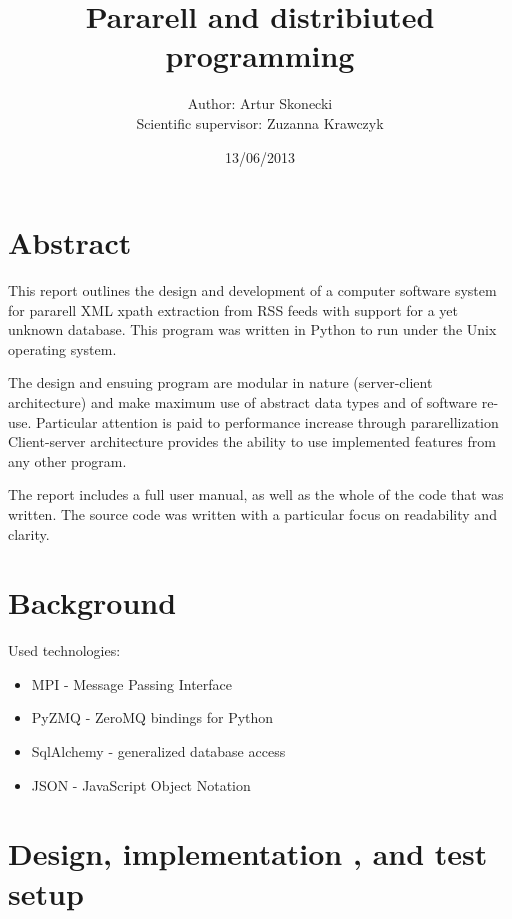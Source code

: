 \documentclass[a4paper,12pt]{article}
\title{Pararell and distribiuted programming}
\author{Author: Artur Skonecki \\ Scientific supervisor: Zuzanna Krawczyk}
\date{13/06/2013}
\begin{document}
\maketitle
\tableofcontents

\pagebreak
\section{Abstract}

This report outlines the design and development of a computer software
system for pararell XML xpath extraction from RSS feeds with support for a yet unknown database.
This program was written in Python to run under the Unix
operating system.


The design and ensuing program are modular
in nature (server-client architecture) and make maximum use of abstract data types and of software
re-use. Particular attention is paid to performance increase through pararellization
Client-server architecture provides the ability to use implemented features from any other program.


The report includes a full user manual, as well as the whole of the code that was written.
The source code was written with a particular focus on readability and clarity.

\section{Background}

Used technologies:
\begin{itemize}
 \item MPI - Message Passing Interface
 \item PyZMQ - ZeroMQ bindings for Python
 \item SqlAlchemy - generalized database access
 \item JSON - JavaScript Object Notation
\end{itemize}

\section{Design, implementation , and test setup}
\end{document}

